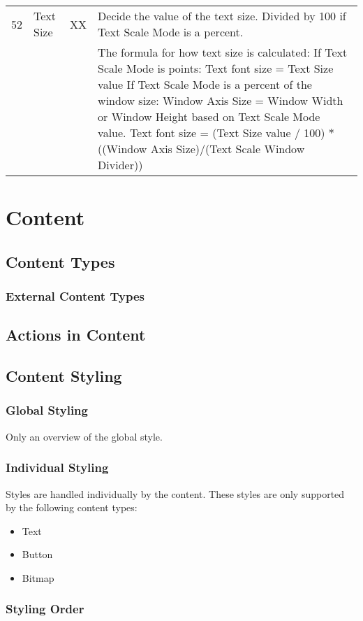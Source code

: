 \documentclass{report}
\begin{document}
\begin{tabularx}{\textwidth}{l|l|l|X}
52 & Text Size & XX & Decide the value of the text size. Divided by 100 if Text Scale Mode is a percent.\\
& & & \makecell[tl]{The formula for how text size is calculated: \\
If Text Scale Mode is points:\\
Text font size = Text Size value\\
If Text Scale Mode is a percent of the window size:\\
Window Axis Size = Window Width or Window Height based on Text Scale Mode value.\\
Text font size = (Text Size value $/$ 100) $*$ ((Window Axis Size)$/$(Text Scale Window Divider))
}


\end{tabularx}
\section{Content}
\subsection{Content Types}
\subsubsection{External Content Types} %
\subsection{Actions in Content}
\subsection{Content Styling}
\subsubsection{Global Styling}
Only an overview of the global style.
\subsubsection{Individual Styling}
Styles are handled individually by the content. These styles are only supported by the following content types:
\begin{itemize}
\item Text
\item Button
\item Bitmap
\end{itemize}
\subsubsection{Styling Order}
\end{document}

